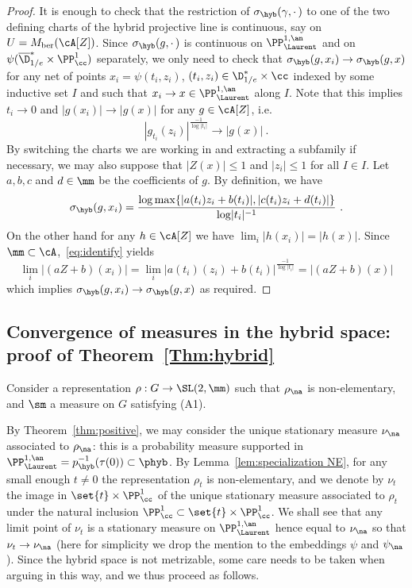 \begin{proof}
It is enough to check that the restriction of $\sigma_{\hyb}(\gamma,{\cdot\,})$ to one of the two defining charts of the hybrid projective line is continuous, say on $U = M_{\mathrm{ber}}(\cA[Z])$. Since $\sigma_{\hyb}(g,{\cdot\,})$ is continuous on $\PP^{1,\an}_{\Laurent}$ and on $\psi (\overline{\D}^*_{1/e} \times \PP^1_\cc)$ separately, we only need to check that $\sigma_{\hyb}(g,x_i) \to \sigma_{\hyb}(g,x)$ for any net of points $x_i = \psi(t_i, z_i)$, $(t_i, z_i)\in {\D}^*_{1/e} \times \cc $ indexed by some inductive set $I$ and such that $x_i \to x \in \PP^{1,\an}_{\Laurent}$ along $I$. Note that this implies $t_i \to 0$ and $|g(x_i)| \to |g(x)|$ for any $g\in \cA[Z]$, i.e.
\[
|g_{t_i}(z_i)|^{\frac{-1}{\log\mathopen| t_i\mathclose|}} \to |g(x)|~.
\]
By switching the charts we are working in and extracting a subfamily if necessary, we may also suppose that $|Z(x)| \le 1$ and $|z_i| \le 1$ for all $I\in I$. Let $a,b,c$ and $d\in \mm$ be the coefficients of $g$. By definition, we have
\[
\sigma_{\hyb}(g,x_i) =
\frac{\log \max\{ |a(t_i) z_i +b(t_i)|, |c(t_i) z_i + d(t_i)|\}}{\log\mathopen|t_i\mathclose|^{-1}}~.
\]
On the other hand for any $h\in \cA[Z]$ we have $\lim_i |h(x_i)| = |h(x)|$. Since $\mm \subset \cA$,~\eqref{eq:identify} yields
\[
\lim_i |(a Z + b)(x_i)| =\lim_i |a(t_i)(z_i) + b(t_i)|^{\frac{-1}{\log\mathopen| t_i\mathclose|}} = |(aZ+b)(x)|
\]
which implies $\sigma_{\hyb}(g,x_i) \to \sigma_{\hyb}(g,x)$ as required.
\end{proof}


\subsection{Convergence of measures in the hybrid space: proof of Theorem~\ref{Thm:hybrid}}

Consider a representation $\rho: G \to \SL(2,\mm)$ such that $\rho_{\na}$ is non-elementary, and $\sm$ a measure on $G$ satisfying (A1).

By Theorem~\ref{thm:positive}, we may consider the unique stationary measure $\nu_{\na}$ associated to $\rho_{\na}$: this is a probability measure supported in $\PP^{1,\an}_{\Laurent} = p_{\hyb}^{-1}(\tau(0)) \subset \phyb$. By Lemma~\ref{lem:specialization NE}, for any small enough $t\neq0$ the representation $\rho_t$ is non-elementary, and we denote by $\nu_t$ the image in $ \set{t} \times \PP^1_\cc $ of the unique stationary measure associated to $\rho_t$ under the natural inclusion $\PP^1_\cc \subset \set{t} \times \PP^1_\cc $. We shall see that any limit point of $\nu_t$ is a stationary measure on $\PP^{1,\an}_{\Laurent}$ hence equal to $\nu_{\na}$ so that $\nu_t \to \nu_{\na}$ (here for simplicity we drop the mention to the embeddings $\psi$ and $\psi_\na$). Since the hybrid space is not metrizable, some care needs to be taken when arguing in this way, and we thus proceed as follows.

